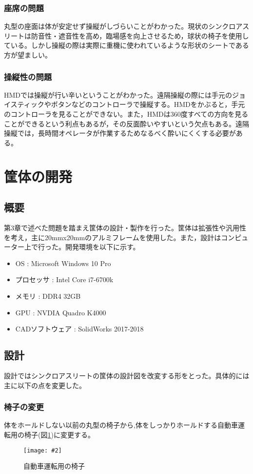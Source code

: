 \documentclass[a4paper,12pt]{jsarticle}
\newcommand{\figuref}[1]{図\ref{#1}}
\newcommand{\fig}[4][width=\textwidth]{
    \begin{figure}[!h]
    \begin{center}
    \texttt{[image: \#2]}
    \caption{#3}
    \label{#4}
    \vspace*{-1cm}
    \end{center}
    \end{figure}
}
\begin{document}
\subsubsection{座席の問題}
丸型の座面は体が安定せず操縦がしづらいことがわかった。現状のシンクロアスリートは防音性・遮音性を高め，臨場感を向上させるため，球状の椅子を使用している。しかし操縦の際は実際に重機に使われているような形状のシートである方が望ましい。

\subsubsection{操縦性の問題}
HMDでは操縦が行い辛いということがわかった。遠隔操縦の際には手元のジョイスティックやボタンなどのコントローラで操縦する。HMDをかぶると，手元のコントローラを見ることができない。また，HMDは360度すべての方向を見ることができるという利点もあるが，その反面酔いやすいという欠点もある。遠隔操縦では，長時間オペレータが作業するためなるべく酔いにくくする必要がある。

\clearpage

\section{筐体の開発}
\subsection{概要}
第3章で述べた問題を踏まえ筐体の設計・製作を行った。筐体は拡張性や汎用性を考え，主に20mmx20mmのアルミフレームを使用した。また，設計はコンピューター上で行った。開発環境を以下に示す。
\begin{itemize}
    \item OS : Microsoft Windows 10 Pro
    \item プロセッサ : Intel Core i7-6700k
    \item メモリ : DDR4 32GB
    \item GPU : NVDIA Quadro K4000
    \item CADソフトウェア : SolidWorks 2017-2018
\end{itemize}

\subsection{設計}
設計ではシンクロアスリートの筐体の設計図を改変する形をとった。具体的には主に以下の点を変更した。

\subsubsection{椅子の変更}
体をホールドしない以前の丸型の椅子から,体をしっかりホールドする自動車運転用の椅子(\figuref{recaro})に変更する。
\fig[width=9cm]{image/recaro.png}{自動車運転用の椅子}{recaro}
\end{document}
